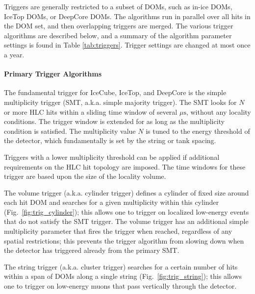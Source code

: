 Triggers are generally restricted to a subset of DOMs, such as in-ice DOMs,
IceTop DOMs, or DeepCore DOMs.  The algorithms run in parallel over all
hits in the DOM set, and then overlapping triggers are merged.   The
various trigger algorithms are described below, and a summary of the
algorithm parameter settings is found in Table \ref{tab:triggers}.  Trigger
settings are changed at most once a year.

\paragraph{Primary Trigger Algorithms}

The fundamental trigger for IceCube, IceTop, and DeepCore is the simple
multiplicity trigger (SMT, a.k.a. simple majority trigger).  The
SMT looks for $N$ or more HLC hits within a sliding time window of several
$\mu\mathrm{s}$, without any locality conditions.  The trigger window is
extended for as long as the multiplicity condition is satisfied.
The multiplicity value $N$ is tuned to the energy threshold of the
detector, which fundamentally is set by the string or tank spacing. 

Triggers with a lower multiplicity threshold can be applied if additional requirements on the
HLC hit topology are imposed.  The time windows for these trigger are based upon the
size of the locality volume.

The volume trigger (a.k.a. cylinder
  trigger) defines a cylinder of fixed size around each hit DOM and
searches for a given multiplicity within this cylinder
(Fig.~\ref{fig:trig_cylinder}); this allows one to trigger on localized
low-energy events that do not satisfy the SMT trigger.  The volume trigger
has an additional simple multiplicity parameter that fires the trigger when
reached, regardless of any spatial restrictions; this prevents the trigger
algorithm from slowing down when the detector has triggered already from
the primary SMT.

The string trigger (a.k.a. cluster trigger) searches for a
certain number of hits within a span of DOMs along a single
string (Fig.~\ref{fig:trig_string}); this allows one to trigger on
low-energy muons that pass vertically 
through the detector.  

